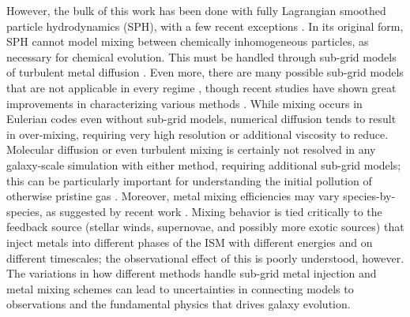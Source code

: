 \documentclass[twocolumn]{aastex61}
\begin{document}

   However, the bulk of this work has been done with fully Lagrangian
smoothed particle hydrodynamics (SPH), 
    with a few recent exceptions  \citep{Few2012,Few2014,Vorobyov2015}. In its original form, 
    SPH cannot model
mixing between chemically inhomogeneous particles, as necessary for chemical evolution. This must be handled through sub-grid models of turbulent metal diffusion \citep[e.g.][]{Shen2010, Shen2013,Brook2014,Su2017a}. Even more, there are many possible sub-grid models that are not applicable in every regime \citep[see ][]{Revaz2016}, though recent studies have shown great improvements in characterizing various methods \citep{Escala2017}. While mixing occurs in Eulerian codes even without sub-grid models, numerical diffusion tends to result in over-mixing, requiring very high resolution or additional viscosity to reduce. Molecular diffusion %
    or even turbulent mixing
is certainly not resolved in any galaxy-scale simulation with either method, requiring additional sub-grid models; this can be particularly important for understanding the initial pollution of otherwise pristine gas \citep[see ][ and references therein]{PanScannapiecoScalo2013,Sarmento2017}. Moreover, metal mixing efficiencies may vary species-by-species, as suggested by recent work \citep[e.g.][]{Cohen2013, Roederer2014, FrebelNorris2015, Hirai2017, Cote2017}. Mixing behavior is tied critically to the feedback source (stellar winds, supernovae, and possibly more exotic sources) 
    that inject metals into 
    different phases of 
the ISM with different energies and on different timescales; the observational effect of this is poorly understood, however. The variations in how different methods handle sub-grid metal injection and metal mixing schemes can lead to uncertainties in connecting models to observations and the fundamental physics that drives galaxy evolution.
\end{document}
